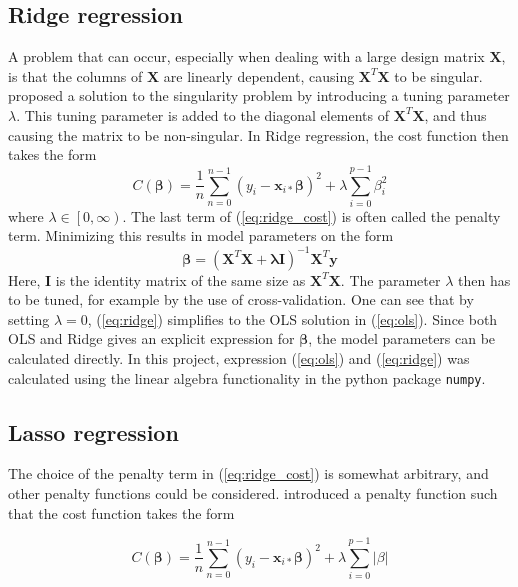 \subsection{Ridge regression}
A problem that can occur, especially when dealing with a large design matrix $\boldsymbol{X}$, is that the columns of $\boldsymbol{X}$ are linearly dependent, causing $\boldsymbol{X}^T\boldsymbol{X}$ to be singular. \cite{hoerl1970ridge} proposed a solution to the singularity problem by introducing a tuning parameter $\lambda$. This tuning parameter is added to the diagonal elements of  $\boldsymbol{X}^T\boldsymbol{X}$, and thus causing the matrix to be non-singular. 
In Ridge regression, the cost function then takes the form 
\begin{equation}\label{eq:ridge_cost}
	C(\boldsymbol{\beta}) 
	= \frac{1}{n}\sum_{n=0}^{n-1} \left(y_i-\boldsymbol{x}_{i*}\boldsymbol{\beta}\right)^2 + \lambda \sum_{i=0}^{p-1}\beta_i^2
\end{equation}
where $\lambda \in \left[0,\infty\right)$. The last term of (\ref{eq:ridge_cost}) is often called the penalty term. 
Minimizing this results in model parameters on the form
\begin{equation}\label{eq:ridge}
\boldsymbol{\beta}=\left(\boldsymbol{X}^T\boldsymbol{X}+\boldsymbol{\lambda}\boldsymbol{I}\right)^{-1}\boldsymbol{X}^T\boldsymbol{y}
\end{equation}
Here, $\boldsymbol{I}$ is the identity matrix of the same size as $\boldsymbol{X}^T\boldsymbol{X}$. The parameter $\lambda$ then has to be tuned, for example by the use of cross-validation. 
One can see that by setting $\lambda = 0$, (\ref{eq:ridge}) simplifies to the OLS solution in (\ref{eq:ols}).
Since both OLS and Ridge gives an explicit expression for $\boldsymbol{\beta}$, the model parameters can be calculated directly. In this project, expression (\ref{eq:ols}) and (\ref{eq:ridge}) was calculated using the linear algebra functionality in the python package \texttt{numpy}.
	
\subsection{Lasso regression}
The choice of the penalty term in (\ref{eq:ridge_cost}) is somewhat arbitrary, and other penalty functions could be considered. \cite{tibshirani1996lasso} introduced a penalty function such that the cost function takes the form

\begin{equation*}
C(\boldsymbol{\beta}) 
= \frac{1}{n}\sum_{n=0}^{n-1} \left(y_i-\boldsymbol{x}_{i*}\boldsymbol{\beta}\right)^2 + \lambda \sum_{i=0}^{p-1}\left|\beta\right|
\end{equation*}

